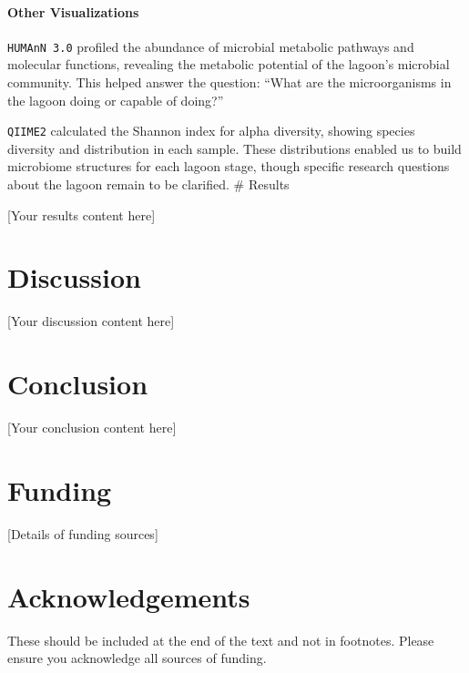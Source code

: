 \documentclass[
]{article}
\begin{document}
\hypertarget{other-visualizations}{%
\paragraph{Other Visualizations}\label{other-visualizations}}

\texttt{HUMAnN\ 3.0} profiled the abundance of microbial metabolic
pathways and molecular functions, revealing the metabolic potential of
the lagoon's microbial community. This helped answer the question:
``What are the microorganisms in the lagoon doing or capable of doing?''

\texttt{QIIME2} calculated the Shannon index for alpha diversity,
showing species diversity and distribution in each sample. These
distributions enabled us to build microbiome structures for each lagoon
stage, though specific research questions about the lagoon remain to be
clarified. \# Results

{[}Your results content here{]}

\hypertarget{discussion}{%
\section{Discussion}\label{discussion}}

{[}Your discussion content here{]}

\hypertarget{conclusion}{%
\section{Conclusion}\label{conclusion}}

{[}Your conclusion content here{]}

\hypertarget{funding}{%
\section{Funding}\label{funding}}

{[}Details of funding sources{]}

\hypertarget{acknowledgements}{%
\section{Acknowledgements}\label{acknowledgements}}

These should be included at the end of the text and not in footnotes.
Please ensure you acknowledge all sources of funding.
\end{document}

